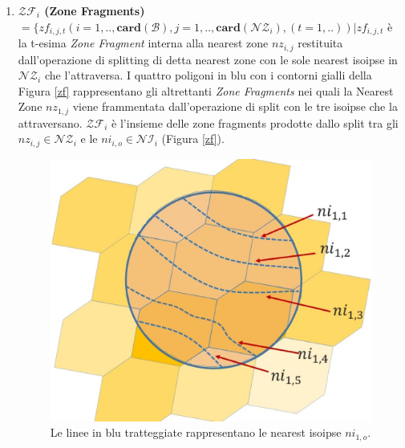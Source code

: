\begin{enumerate}
	\item \textbf{$\mathcal{ZF}_i$ (Zone Fragments)} $ = \{ zf_{i,j,t} (i=1,..,\mathbf{card}(\mathcal{B}),j=1,..,\mathbf{card}(\mathcal{NZ}_i),(t=1,..))| zf_{i,j,t}  $ è la t-esima \textit{Zone Fragment} interna alla nearest zone $nz_{i,j}$ restituita dall'operazione di splitting di detta nearest zone con le sole nearest isoipse in $\mathcal{NZ}_i $ che l'attraversa.
	I quattro poligoni in blu con i contorni gialli della Figura \ref{zf} rappresentano gli altrettanti \textit{Zone Fragments} nei quali la Nearest Zone $nz_{1,j}$ viene frammentata dall'operazione di split con le tre isoipse che la attraversano. $\mathcal{ZF}_i$ è l'insieme delle zone fragments prodotte dallo split tra gli $nz_{i,j} \in \mathcal{NZ}_i $ e le $ni_{i,o} \in \mathcal{NI}_i$ (Figura \ref{zf}). 
	
	
	\begin{figure}[h]
		\hspace{0.05\linewidth}
		\begin{minipage}[t]{0.45\linewidth}
			\centering
			\includegraphics[width=1\textwidth]{images/ni}
			\caption{Le linee in blu tratteggiate rappresentano le nearest isoipse $ni_{1,o}$.}
			\label{NearestIso}
		\end{minipage}
		\hspace{0.05\linewidth}
		\begin{minipage}[t]{0.45\linewidth}
			\centering

\end{minipage}
\end{figure}
\end{enumerate}
